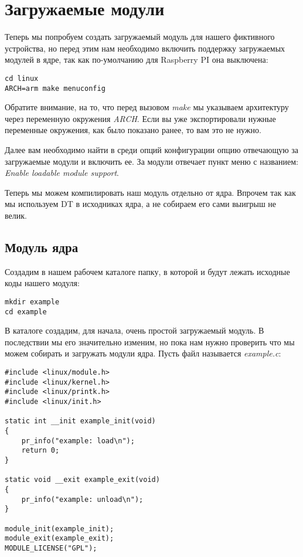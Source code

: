 \section{Загружаемые модули}

Теперь мы попробуем создать загружаемый модуль для нашего фиктивного устройства,
но перед этим нам необходимо включить поддержку загружаемых модулей в ядре, так
как по-умолчанию для Raspberry PI она выключена:
\begin{lstlisting}
cd linux
ARCH=arm make menuconfig
\end{lstlisting}

Обратите внимание, на то, что перед вызовом \emph{make} мы указываем архитектуру
через переменную окружения \emph{ARCH}. Если вы уже экспортировали нужные
переменные окружения, как было показано ранее, то вам это не нужно.

Далее вам необходимо найти в среди опций конфигурации опцию отвечающую за
загружаемые модули и включить ее. За модули отвечает пункт меню с названием:
\emph{Enable loadable module support}.

Теперь мы можем компилировать наш модуль отдельно от ядра. Впрочем так как мы
используем DT в исходниках ядра, а не собираем его сами выигрыш не велик.

\subsection{Модуль ядра}

Создадим в нашем рабочем каталоге папку, в которой и будут лежать исходные
коды нашего модуля:
\begin{lstlisting}
mkdir example
cd example
\end{lstlisting}

В каталоге создадим, для начала, очень простой загружаемый модуль. В последствии
мы его значительно изменим, но пока нам нужно проверить что мы можем собирать
и загружать модули ядра. Пусть файл называется \emph{example.c}:
\begin{lstlisting}
#include <linux/module.h>
#include <linux/kernel.h>
#include <linux/printk.h>
#include <linux/init.h>

static int __init example_init(void)
{
	pr_info("example: load\n");
	return 0;
}

static void __exit example_exit(void)
{
	pr_info("example: unload\n");
}

module_init(example_init);
module_exit(example_exit);
MODULE_LICENSE("GPL");
\end{lstlisting}

